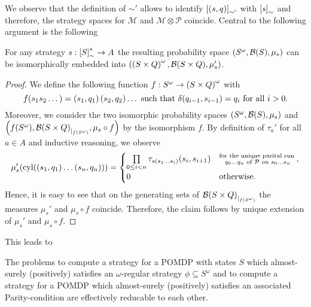 We observe that the definition of $\sim'$ allows to identify
$\left[\left(s,q\right)\right]_{\sim'}$ with $\left[s\right]_{\sim}$ and therefore, the
strategy spaces for $\mathcal{M}$ and $\mathcal{M}\otimes\mathcal{P}$ coincide.
Central to the following argument is the following
\begin{lemma}
  For any strategy $s:\left[S\right]_{\sim}^{*}\rightarrow A$ the resulting
  probability space $\left(S^{\omega}, \mathcal{B}(S), \mu_{s}\right)$ can be
  isomorphically embedded into 
  $\left(\left(S\times Q\right)^{\omega}, \mathcal{B}(S\times Q), \mu_{s}'\right)$.
  \label{lem:embedphiintopomdp}
\end{lemma}
\begin{proof}
  We define the following function $f:S^{\omega}\rightarrow
  \left(S\times Q\right)^{\omega}$ with
  \begin{equation*}
    f(s_{1}s_{2}\dots) = \left(s_{1}, q_{1}\right)\left(s_{2}, q_{2}\right)\dots
    \text{ such that }
    \delta(q_{i-1}, s_{i-1}) = q_{i}\text{ for all }i>0.
  \end{equation*}
  Moreover, we consider the two isomorphic probability spaces
  $\left(S^{\omega}, \mathcal{B}(S), \mu_{s}\right)$ and 
  $\left(f(S^{\omega}), {\mathcal{B}(S\times Q)}_{|_{f(S^{\omega})}},
    \mu_{s}\circ f\right)$ by the isomorphism $f$. By definition of $\tau_{a}'$ for
  all $a\in A$ and inductive reasoning, we observe
  \begin{equation*}
    \mu_{s}'(\operatorname{cyl}(\left(s_{1}, q_{1}\right)\dots\left(s_{n}, q_{n}\right))) = 
    \begin{cases}
      \prod\limits_{0\leq i<n}\tau_{s(s_{1}\dots s_{i})}(s_{i}, s_{i+1})
        &\substack{\text{for the unique parital run }\\q_{0}\dots q_{n}
          \text{ of }\mathcal{P}\text{ on }s_{0}\dots s_{n}},\\
      0&\text{otherwise}.
    \end{cases}
  \end{equation*}
  Hence, it is easy to see that on the generating sets of
  ${\mathcal{B}(S\times Q)}_{|_{f(S^{\omega})}}$ the measures $\mu_{s}'$
  and $\mu_{s}\circ f$ coincide. Therefore, the claim follows by unique
  extension of $\mu_{s}'$ and $\mu_{s}\circ f$.
\end{proof}
This leads to
\begin{theorem}
  The problems to compute a strategy for a \ac{POMDP} with states $S$ which
  almost-surely (positively) satisfies an $\omega$-regular strategy
  $\phi\subseteq S^{\omega}$ and to compute a strategy for a \ac{POMDP} which
  almost-surely (positively) satisfies an associated Parity-condition are
  effectively reducable to each other.
  \label{thm:POMDPomegareg}
\end{theorem}

